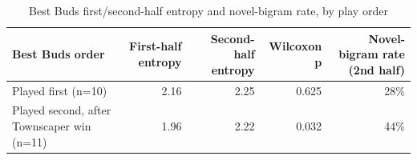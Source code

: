 \begin{table}[t]
\centering
\caption{Best Buds first/second-half entropy and novel-bigram rate, by play order}
\label{tab:rq6-bestbuds-order-entropy}
\begin{tabular}{lrrrr}
\toprule
Best Buds order & First-half entropy & Second-half entropy & Wilcoxon p & Novel-bigram rate (2nd half) \\
\midrule
Played first (n=10) & 2.16 & 2.25 & 0.625 & 28\% \\
Played second, after Townscaper win (n=11) & 1.96 & 2.22 & 0.032 & 44\% \\
\bottomrule
\end{tabular}
\end{table}
